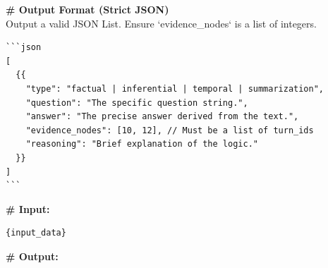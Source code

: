 \documentclass[11pt]{article}
\begin{document}
\begin{promptbox}
\vspace{0.5em}
\textbf{\# Output Format (Strict JSON)}\\
Output a valid JSON List. Ensure `evidence\_nodes` is a list of integers.

\begin{verbatim}
```json
[
  {{
    "type": "factual | inferential | temporal | summarization",
    "question": "The specific question string.",
    "answer": "The precise answer derived from the text.",
    "evidence_nodes": [10, 12], // Must be a list of turn_ids
    "reasoning": "Brief explanation of the logic."
  }}
]
```
\end{verbatim}

\vspace{0.5em}
\textbf{# Input:}\
\begin{verbatim}
{input_data}
\end{verbatim}

\vspace{0.5em}
\textbf{# Output:}
\end{promptbox}
\end{document}

